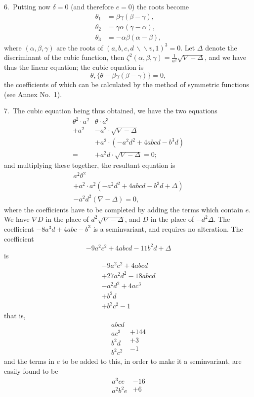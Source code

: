 \documentclass[11pt,a4paper]{article}
\theoremstyle{plain}
\theoremstyle{definition}
\theoremstyle{remark}
\begin{document}
6.\ Putting now $\delta=0$ (and therefore $e=0$) the roots become
\begin{align*}
\theta_1 &= \beta\gamma(\beta-\gamma),\\
\theta_2 &= \gamma\alpha(\gamma-\alpha),\\
\theta_3 &= -\alpha\beta(\alpha-\beta),
\end{align*}
where $(\alpha,\beta,\gamma)$ are the roots of $(a,b,c,d\,\backslash\!\!\backslash v,1)^3=0$. Let $\Delta$ denote the discriminant of the cubic function, then $\zeta^2(\alpha,\beta,\gamma)=\frac{1}{a^2}\sqrt{\nabla-\Delta}$, and we have thus the linear equation; the cubic equation is
\[
\theta,\{\theta-\beta\gamma(\beta-\gamma)\}=0,
\]
the coefficients of which can be calculated by the method of symmetric functions (see Annex No.~1).

\newpage
\setcounter{page}{302}

7.\ The cubic equation being thus obtained, we have the two equations
\[
\begin{array}{cc}
\theta^2\cdot a^2 & \theta\cdot a^3\\
+ a^2 & -a^2\cdot\sqrt{\nabla-\Delta}\\
& +a^2\cdot(-a^2d^2+4abcd-b^3d)\\
=& +a^2d\cdot\sqrt{\nabla-\Delta} = 0;
\end{array}
\]
and multiplying these together, the resultant equation is
\[
\begin{array}{c}
a^2\theta^2\\
+a^2\cdot a^2(-a^2d^2+4abcd-b^3d+\Delta)\\
-a^2d^2(\nabla-\Delta)=0,
\end{array}
\]
where the coefficients have to be completed by adding the terms which contain $e$. We have $\nabla D$ in the place of $d^2\sqrt{\nabla-\Delta}$, and $D$ in the place of $-d^2\Delta$. The coefficient $-8a^3d+4abc-b^3$ is a seminvariant, and requires no alteration. The coefficient
\[
-9a^2c^2+4abcd-11b^2d+\Delta
\]
is
\[
\begin{array}{r}
-9a^2c^2+4abcd\\
+27a^2d^2-18abcd\\
\hline
-a^2d^2+4ac^3\\
+b^2d\\
+b^2c^2-1
\end{array}
\]
that is,
\[
\begin{array}{c}
abcd\\
ac^3\\
b^2d\\
b^2c^2
\end{array}
\begin{array}{r}
\\
+144\\
+3\\
-1
\end{array}
\]
and the terms in $e$ to be added to this, in order to make it a seminvariant, are easily found to be
\[
\begin{array}{c}
a^3ce\\
a^2b^2e
\end{array}
\begin{array}{r}
-16\\
+6
\end{array}
\]
\end{document}
